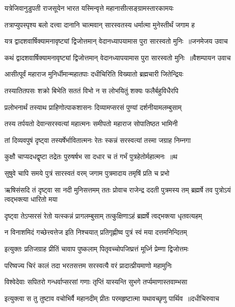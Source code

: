 \twolineshloka
{यत्रेजिवानुडुपती राजसूयेन भारत}
{यस्मिन्वृत्ते महानासीत्सङ्ग्रामस्तारकामयः}


\twolineshloka
{तत्राप्युपस्पृश्य बलो दत्त्वा दानानि चात्मवान्}
{सारस्वतस्य धर्मात्मा मुनेस्तीर्थं जगाम ह}


\threelineshloka
{यत्र द्वादशवार्षिक्यामनावृष्ट्यां द्विजोत्तमान्}
{वेदानध्यापयामास पुरा सारस्वतो मुनिः ॥जनमेजय उवाच}
{}


\threelineshloka
{कथं द्वादशवार्षिक्यामनावृष्ट्यां द्विजोत्तमान्}
{वेदानध्यापयामास पुरा सारस्वतो मुनिः ॥वैशम्पायन उवाच}
{}


\twolineshloka
{आसीत्पूर्वं महाराज मुनिर्धीमान्महातपाः}
{दधीचिरिति विख्यातो ब्रह्मचारी जितेन्द्रियः}


\twolineshloka
{तस्यातितपसः शक्रो बिभेति सततं विभो}
{न स लोभयितुं शक्यः फलैर्बहुविधैरपि}


\twolineshloka
{प्रलोभनार्थं तस्याथ प्राहिणोत्पाकशासनः}
{दिव्यामप्सरसं पुण्यां दर्शनीयामलम्बुसाम्}


\twolineshloka
{तस्य तर्पयतो देवान्सरस्वत्यां महात्मनः}
{समीपतो महाराज सोपातिष्ठत भामिनी}


\twolineshloka
{तां दिव्यवपुषं दृष्ट्वा तस्यर्षेर्भावितात्मनः}
{रेतः स्कन्नं सरस्वत्यां तस्मा जग्राह निम्नगा}


\twolineshloka
{कुक्षौ चाप्यदधद्वृष्टा तद्रेतः पुरुषर्षभ}
{सा दधार च तं गर्भं पुत्रहेतोर्महात्मनः ॥थ}


\twolineshloka
{सुषुवे चापि समये पुत्रं सारस्वतं वरम्}
{जगाम पुत्रमादाय तमृषिं प्रति च प्रभो}


\threelineshloka
{ऋषिसंसदि तं दृष्ट्वा सा नदी मुनिसत्तमम्}
{ततः प्रोवाच राजेन्द्र ददती पुत्रमस्य तम्}
{ब्रह्मर्षे तव पुत्रोऽयं त्वद्भक्त्या धारितो मया}


\twolineshloka
{दृष्ट्वा तेऽप्सरसं रेतो यत्स्कन्नं प्रागलम्बुसाम्}
{तत्कुक्षिणाऽहं ब्रह्मर्षे त्वद्भक्त्या धृतवत्यहम्}


\twolineshloka
{न विनाशमिदं गच्छेत्त्वत्तेज इति निश्चयात्}
{प्रतिगृह्णीष्व पुत्रं स्वं मया दत्तमनिन्दितम्}


\twolineshloka
{इत्युक्तः प्रतिजग्राह प्रीतिं चावाप पुष्कलाम्}
{पितृवच्चोपजिघ्रत्तं मूर्ध्नि प्रेम्णा द्विजोत्तमः}


\twolineshloka
{परिष्वज्य चिरं कालं तदा भरतसत्तम}
{सरस्वत्यै वरं प्रादात्प्रीयमाणो महामुनिः}


\twolineshloka
{विश्वेदेवाः सपितरो गन्धर्वाप्सरसां गणाः}
{तृप्तिं यास्यन्ति सुभगे तर्प्यमाणास्तवाम्भसा}


\threelineshloka
{इत्युक्त्वा स तु तुष्टाव वचोभिर्वै महानदीम्}
{प्रीतः परमहृष्टात्मा यथावच्छृणु पार्थिव ॥दधीचिरुवाच}
{}


